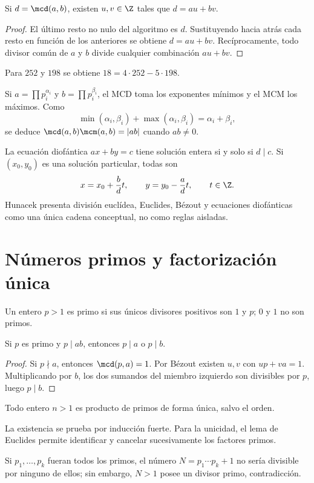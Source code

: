 \documentclass[10pt,a4paper]{article}
\begin{document}
\begin{teorema}
Si $d=\mcd(a,b)$, existen $u,v\in\Z$ tales que $d=au+bv$.
\end{teorema}
\begin{proof}
El último resto no nulo del algoritmo es $d$. Sustituyendo hacia atrás cada resto en función de los anteriores se obtiene $d=au+bv$. Recíprocamente, todo divisor común de $a$ y $b$ divide cualquier combinación $au+bv$.
\end{proof}
Para $252$ y $198$ se obtiene $18=4\cdot252-5\cdot198$.

Si $a=\prod p_i^{\alpha_i}$ y $b=\prod p_i^{\beta_i}$, el MCD toma los exponentes mínimos y el MCM los máximos. Como
\[
\min(\alpha_i,\beta_i)+\max(\alpha_i,\beta_i)=\alpha_i+\beta_i,
\]
se deduce $\mcd(a,b)\mcm(a,b)=|ab|$ cuando $ab\ne0$.

La ecuación diofántica $ax+by=c$ tiene solución entera si y solo si $d\mid c$. Si $(x_0,y_0)$ es una solución particular, todas son
\[
x=x_0+\frac{b}{d}t,\qquad y=y_0-\frac{a}{d}t,\qquad t\in\Z.
\]
Hunacek presenta división euclídea, Euclides, Bézout y ecuaciones diofánticas como una única cadena conceptual, no como reglas aisladas.

\section{Números primos y factorización única}
Un entero $p>1$ es primo si sus únicos divisores positivos son $1$ y $p$; $0$ y $1$ no son primos.

\begin{lema}[Euclides]
Si $p$ es primo y $p\mid ab$, entonces $p\mid a$ o $p\mid b$.
\end{lema}
\begin{proof}
Si $p\nmid a$, entonces $\mcd(p,a)=1$. Por Bézout existen $u,v$ con $up+va=1$. Multiplicando por $b$, los dos sumandos del miembro izquierdo son divisibles por $p$, luego $p\mid b$.
\end{proof}

\begin{teorema}
Todo entero $n>1$ es producto de primos de forma única, salvo el orden.
\end{teorema}
La existencia se prueba por inducción fuerte. Para la unicidad, el lema de Euclides permite identificar y cancelar sucesivamente los factores primos.

\begin{ampliacion}
Si $p_1,\ldots,p_k$ fueran todos los primos, el número $N=p_1\cdots p_k+1$ no sería divisible por ninguno de ellos; sin embargo, $N>1$ posee un divisor primo, contradicción.
\end{ampliacion}
\end{document}
